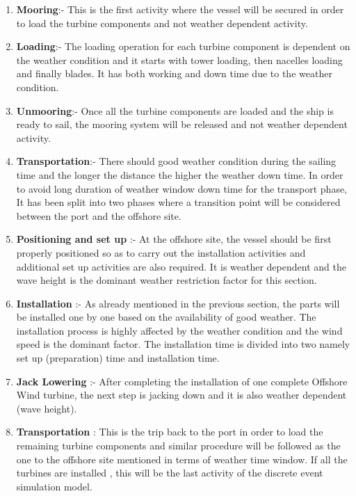 \begin{enumerate}
\item \textbf{Mooring}:- This is the first activity where the vessel will be secured in order to load the turbine components and not weather dependent activity.
\item \textbf{Loading}:- The loading operation for each turbine component is dependent on the weather condition and it starts with tower loading, then nacelles loading and finally blades. It has both working and down time due to the weather condition.
\item \textbf{Unmooring}:- Once all the turbine components are loaded and the ship is ready to sail, the mooring system will be released and not weather dependent activity.
\item \textbf{Transportation}:- There should good weather condition during the sailing time and the longer the distance the higher the weather down time. In order to avoid long duration of weather window down time  for the transport phase, It has been split into two phases where a transition point will be considered between the port and the offshore site.
\item \textbf{Positioning and set up} :- At the offshore site, the vessel should be first properly positioned so as to carry out the installation activities and  additional set up activities are also required. It is weather dependent and the wave height is the dominant weather restriction factor for this section.

\item \textbf{Installation} :- As already mentioned in the previous section, the parts will be installed one by one based on the availability of good weather. The installation process is highly affected by the weather condition and the wind speed is the dominant factor. The installation time is  divided into two namely set up (preparation) time and installation time. 
\item \textbf{Jack Lowering} :- After completing the installation of one complete Offshore Wind turbine, the next step is jacking down and it is also weather dependent (wave height).
\item \textbf{Transportation} : This is the trip back to the port in order to load the remaining turbine components and similar procedure will be followed as the one to the offshore site mentioned in terms of weather time window. If all the turbines are installed , this will be the last activity of the discrete event simulation model.

\end{enumerate}